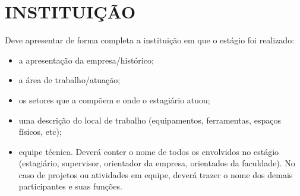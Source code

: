 
\chapter{INSTITUIÇÃO}
\label{chap:instituicao}
Deve apresentar de forma completa a instituição em que o estágio foi realizado:
\begin{itemize}
\item a apresentação da empresa/histórico;
\item a área de trabalho/atuação;
\item os setores que a compõem e onde o estagiário atuou;
\item uma descrição do local de trabalho (equipamentos, ferramentas, espaços físicos, etc);
\item equipe técnica. Deverá conter o nome de todos os envolvidos no estágio (estagiário, supervisor, orientador da empresa, orientados da faculdade). No caso de projetos ou atividades em equipe, deverá trazer o nome dos demais participantes e suas funções.
\end{itemize}

